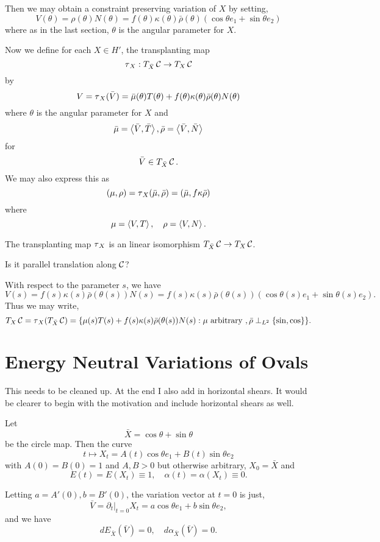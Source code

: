 \documentclass[12pt]{article}
\begin{document}
Then we may obtain a constraint preserving variation of \(X\) by setting,
\[
V(\theta) = \rho(\theta) N(\theta) = f(\theta) \kappa(\theta) \bar{\rho}(\theta) (\cos\theta e_1 + \sin\theta e_2)
\]
where as in the last section, \(\theta\) is the angular parameter for \(X\).

Now we define for each \(X \in H'\), the transplanting map
\[
\operatorname{\tau}_X : T_{\bar{X}} \operatorname{\mathcal{C}} \to T_X \operatorname{\mathcal{C}}
\]
by
\[
V = \operatorname{\tau}_X(\bar{V}) = \bar{\mu}(\theta) T(\theta) + f(\theta)\kappa(\theta)\bar{\rho}(\theta) N(\theta)
\]
where \(\theta\) is the angular parameter for \(X\) and
\[
\bar{\mu} = \left\langle{\bar{V}},{\bar{T}}\right\rangle, \bar{\rho} = \left\langle{\bar{V}},{\bar{N}}\right\rangle
\]
for
\[
\bar{V} \in T_{\bar{X}} \operatorname{\mathcal{C}}.
\]
We may also express this as
\[
(\mu, \rho) = \operatorname{\tau}_X(\bar{\mu}, \bar{\rho}) = (\bar{\mu}, f\kappa\bar{\rho})
\]
where
\[
\mu = \left\langle{V},{T}\right\rangle, \quad \rho = \left\langle{V},{N}\right\rangle.
\]

The transplanting map \(\operatorname{\tau}_X\) is an linear isomorphism \(T_{\bar{X}} \operatorname{\mathcal{C}} \to T_X \operatorname{\mathcal{C}}\).

{\color{red} Is it parallel translation along \(\operatorname{\mathcal{C}}\)?}

With respect to the parameter \(s\), we have
\[
V(s) = f(s) \kappa(s) \bar{\rho}(\theta(s)) N(s) = f(s) \kappa(s) \bar{\rho}(\theta(s))(\cos\theta(s) e_1 + \sin\theta(s) e_2).
\]
Thus we may write,
\[
T_X \operatorname{\mathcal{C}} = \operatorname{\tau}_X(T_{\bar{X}} \operatorname{\mathcal{C}}) = \{\mu(s) T(s) + f(s) \kappa(s) \bar{\rho}(\theta(s)) N(s) : \mu \text{ arbitrary }, \bar{\rho} \perp_{L^2} \{\sin, \cos\}\}.
\]

\section{Energy Neutral Variations of Ovals}

{\color{red} This needs to be cleaned up. At the end I also add in horizontal shears. It would be clearer to begin with the motivation and include horizontal shears as well.}

Let
\[
\bar{X} = \cos\theta + \sin \theta
\]
be the circle map. Then the curve
\[
t \mapsto X_t = A(t) \cos\theta e_1 + B(t) \sin \theta e_2
\]
with \(A(0) = B(0) = 1\) and \(A, B > 0\) but otherwise arbitrary, \(X_0 = \bar{X}\) and
\[
E(t) = E(X_t) \equiv 1, \quad \alpha(t) = \alpha(X_t) \equiv 0.
\]

Letting \(a = A'(0), b = B'(0)\), the variation vector at \(t = 0\) is just,
\[
\bar{V} = \partial_t|_{t=0} X_t = a \cos\theta e_1 + b \sin\theta e_2,
\]
and we have
\[
dE_{\bar{X}} (\bar{V}) = 0, \quad d\alpha_{\bar{X}} (\bar{V}) = 0.
\]
\end{document}
